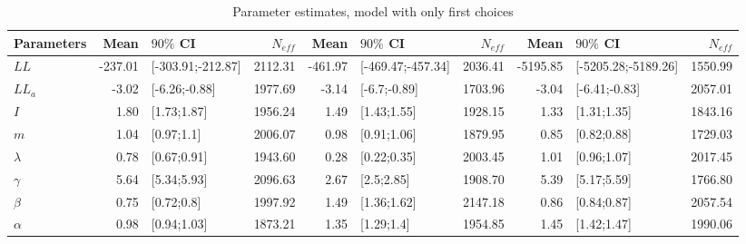 \begin{table}

\caption{Parameter estimates, model with only first choices}
\centering
\begin{tabular}[t]{lrlrrlrrlr}
\toprule
Parameters & Mean & $90\%$ CI & $N_{eff}$ & Mean & $90\%$ CI & $N_{eff}$ & Mean & $90\%$ CI & $N_{eff}$\\
\midrule
$LL$ & -237.01 & {}[-303.91;-212.87] & 2112.31 & -461.97 & {}[-469.47;-457.34] & 2036.41 & -5195.85 & {}[-5205.28;-5189.26] & 1550.99\\
$LL_a$ & -3.02 & {}[-6.26;-0.88] & 1977.69 & -3.14 & {}[-6.7;-0.89] & 1703.96 & -3.04 & {}[-6.41;-0.83] & 2057.01\\
$I$ & 1.80 & {}[1.73;1.87] & 1956.24 & 1.49 & {}[1.43;1.55] & 1928.15 & 1.33 & {}[1.31;1.35] & 1843.16\\
$m$ & 1.04 & {}[0.97;1.1] & 2006.07 & 0.98 & {}[0.91;1.06] & 1879.95 & 0.85 & {}[0.82;0.88] & 1729.03\\
$\lambda$ & 0.78 & {}[0.67;0.91] & 1943.60 & 0.28 & {}[0.22;0.35] & 2003.45 & 1.01 & {}[0.96;1.07] & 2017.45\\
\addlinespace
$\gamma$ & 5.64 & {}[5.34;5.93] & 2096.63 & 2.67 & {}[2.5;2.85] & 1908.70 & 5.39 & {}[5.17;5.59] & 1766.80\\
$\beta$ & 0.75 & {}[0.72;0.8] & 1997.92 & 1.49 & {}[1.36;1.62] & 2147.18 & 0.86 & {}[0.84;0.87] & 2057.54\\
$\alpha$ & 0.98 & {}[0.94;1.03] & 1873.21 & 1.35 & {}[1.29;1.4] & 1954.85 & 1.45 & {}[1.42;1.47] & 1990.06\\
\bottomrule
\end{tabular}
\end{table}
